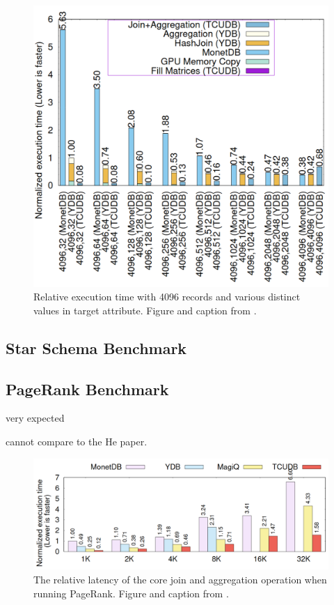\documentclass{paper}
\begin{document}
		\begin{figure}
		\centering
		\includegraphics[width=0.9\linewidth]{bench2}
		\caption{Relative execution time with 4096 records and various distinct values in target attribute. Figure and caption from \cite{hu2021tcudb}.}
		\label{fig:bench2}
	\end{figure}
	
	\subsection{Star Schema Benchmark}
	
	\subsection{PageRank Benchmark}
	
	
	very expected
	
	cannot compare to the He paper.
	
	

	\begin{figure}
		\centering
		\includegraphics[width=0.9\linewidth]{bench3}
		\caption{The relative latency of the core join and aggregation operation when running PageRank. Figure and caption from \cite{hu2021tcudb}.}
		\label{fig:bench3}
	\end{figure}
	
\end{document}
